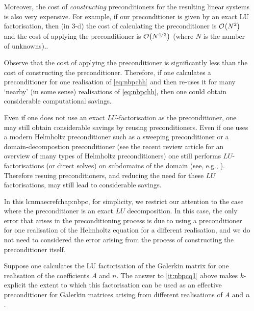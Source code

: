 Moreover, the cost of \emph{constructing} preconditioners for the resulting linear systems is also very expensive. For example, if our preconditioner is given by an exact LU factorisation, then (in 3-d) the cost of calculating the preconditioner is $\cO\mleft(N^2\mright)$ and the cost of applying the preconditioner is $\cO\mleft(N^{4/3}\mright)$ (where $N$ is the number of unknowns)..

Observe that the cost of applying the preconditioner is significantly less than the cost of constructing the preconditioner. Therefore, if one calculates a preconditioner for one realisation of \cref{eq:nbpchh} and then re-uses it for many `nearby' (in some sense) realisations of \cref{eq:nbpchh}, then one could obtain considerable computational savings.

Even if one does not use an exact $LU$-factorisation as the preconditioner, one may still obtain considerable savings by reusing preconditioners. Even if one uses a modern Helmholtz preconditioner such as a sweeping preconditioner or a domain-decompostion preconditioner (see the recent review article \cite{GaZh:19} for an overview of many types of Helmholtz preconditioners) one still performs $LU$-factorisations (or direct solves) on subdomains of the domain (see, e.g., \cite[Section 2]{GaZh:19}). Therefore resuing preconditioners, and reducing the need for these $LU$ factorisations, may still lead to considerable savings.

In this lcnmaecref{chap:nbpc}, for simplicity, we restrict our attention to the case where the preconditioner is an exact $LU$ decomposition. In this case, the only error that arises in the preconditioning process is due to using a preconditioner for one realisation of the Helmholtz equation for a different realisation, and we do not need to considered the error arising from the process of constructing the preconditioner itself.


Suppose one calculates the LU factorisation of the Galerkin matrix for one realisation of the coefficients $A$ and $n$. The answer to \cref{it:nbpcq1} above makes $k$-explicit the extent to which this factorisation can be used as an effective preconditioner for Galerkin matrices arising from different realisations of $A$ and $n$.

